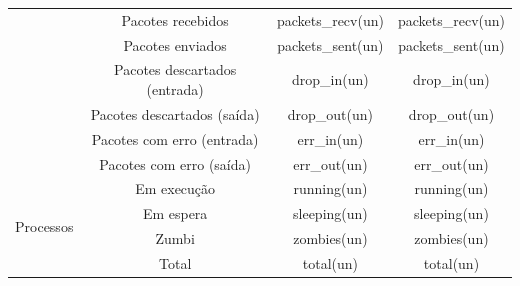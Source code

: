 \begin{table}[H]
\begin{adjustbox}{max width=\textwidth}
\begin{tabular}{|c|c|c|c|}
                      & Pacotes recebidos & packets\_recv(un)   & packets\_recv(un) \\ \cline{2-4}
                      & Pacotes enviados & packets\_sent(un)   & packets\_sent(un) \\ \cline{2-4}
                      & Pacotes descartados (entrada) & drop\_in(un)        & drop\_in(un)          \\ \cline{2-4}
                      & Pacotes descartados (saída) & drop\_out(un)       & drop\_out(un)         \\ \cline{2-4}
                      & Pacotes com erro (entrada) & err\_in(un)         & err\_in(un)         \\ \cline{2-4}
                      & Pacotes com erro (saída) & err\_out(un)        & err\_out(un)       \\ \hline
\multirow{4}{*}{Processos} & Em execução & running(un)  & running(un)  \\ \cline{2-4}
                           & Em espera & sleeping(un) & sleeping(un) \\ \cline{2-4}
                           & Zumbi & zombies(un)  & zombies(un)    \\ \cline{2-4}
                           & Total & total(un)    & total(un) \\ \hline
\end{tabular}
\end{adjustbox}
\end{table}